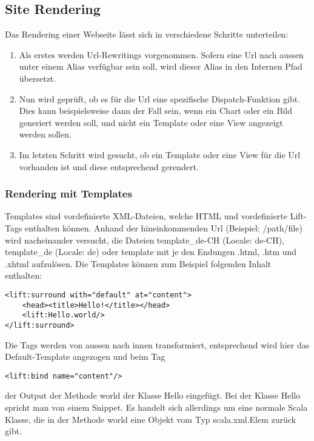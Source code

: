 \subsection{Site Rendering \cite[p. 27-43]{chen2009lift}}
Das Rendering einer Webseite l\"asst sich in verschiedene Schritte unterteilen:

\begin{enumerate}
	\item Als erstes werden Url-Rewritings vorgenommen. Sofern eine Url nach aussen unter einem Alias verf\"ugbar sein soll, wird dieser Alias in den Internen Pfad \"ubersetzt.
	\item Nun wird gepr\"uft, ob es f\"ur die Url eine spezifische Dispatch-Funktion gibt. Dies kann beispielsweise dann der Fall sein, wenn ein Chart oder ein Bild generiert werden soll, und nicht ein Template oder eine View angezeigt werden sollen. 
	\item Im letzten Schritt wird gesucht, ob ein Template oder eine View f\"ur die Url vorhanden ist und diese entsprechend gerendert.
\end{enumerate}

\subsubsection{Rendering mit Templates} \label{grundlagen:templates}
Templates sind vordefinierte XML-Dateien, welche HTML und vordefinierte Lift-Tags enthalten k\"onnen. Anhand der hineinkommenden Url (Beispiel: /path/file) wird nacheinander versucht, die Dateien template\_de-CH (Locale: de-CH), template\_de (Locale: de) oder template mit je den Endungen .html, .htm und .xhtml aufzul\"osen. Die Templates k\"onnen zum Beispiel folgenden Inhalt enthalten:

\begin{lstlisting}[caption=Lift Template Surround]
<lift:surround with="default" at="content">
	<head><title>Hello!</title></head>
	<lift:Hello.world/>
</lift:surround>
\end{lstlisting}

Die Tags werden von aussen nach innen transformiert, entsprechend wird hier das Default-Template angezogen und beim Tag 
\begin{lstlisting}[caption=Lift Template Binding]
<lift:bind name="content"/>
\end{lstlisting}
der Output der Methode world der Klasse Hello eingef\"ugt. Bei der Klasse Hello spricht man von einem Snippet. Es handelt sich allerdings um eine normale Scala Klasse, die in der Methode world eine Objekt vom Typ scala.xml.Elem zur\"uck gibt.

